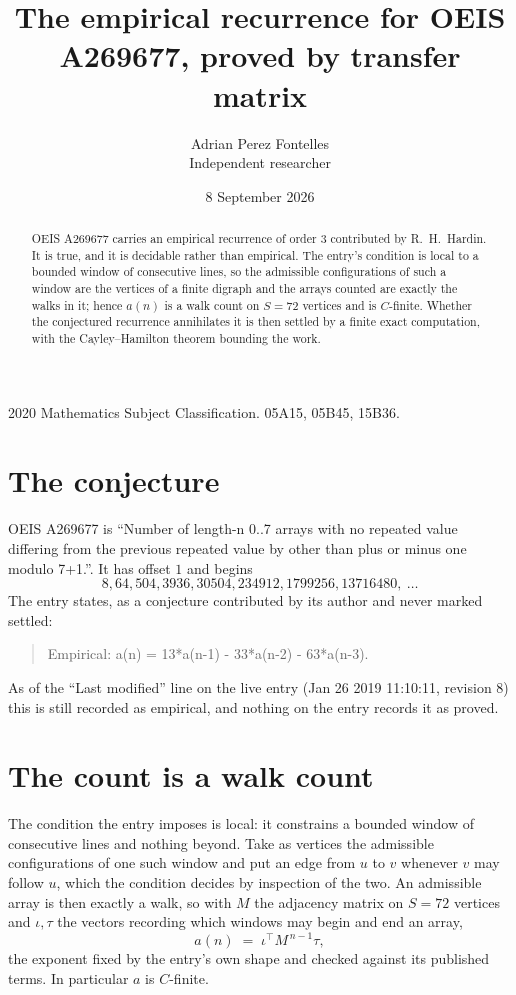 \documentclass[11pt,a4paper]{article}
\title{The empirical recurrence for OEIS A269677, proved by transfer matrix}
\author{Adrian Perez Fontelles\\ \small Independent researcher}
\date{8 September 2026}
\theoremstyle{plain}
\theoremstyle{definition}
\begin{document}
\maketitle

\begin{abstract}
OEIS A269677 carries an empirical recurrence of order $3$ contributed by R.~H.~Hardin. It is
true, and it is decidable rather than empirical. The entry's condition is local to a bounded window of consecutive lines, so
the admissible configurations of such a window are the vertices of a finite digraph and the
arrays counted are exactly the walks in it; hence $a(n)$ is a walk count on $S=72$ vertices
and is $C$-finite. Whether the conjectured recurrence annihilates it is then settled by a
finite exact computation, with the Cayley--Hamilton theorem bounding the work.
\end{abstract}

\noindent\small 2020 Mathematics Subject Classification. 05A15, 05B45, 15B36.\normalsize

\section{The conjecture}

OEIS A269677 is ``Number of length-n 0..7 arrays with no repeated value differing from the previous repeated value by other than plus or minus one modulo 7+1.''. It has offset $1$ and begins
\[
8, 64, 504, 3936, 30504, 234912, 1799256, 13716480,\ \dots
\]
The entry states, as a conjecture contributed by its author and never marked settled:
\begin{quote}
Empirical: a(n) = 13*a(n-1) - 33*a(n-2) - 63*a(n-3).
\end{quote}
As of the ``Last modified'' line on the live entry (Jan 26 2019 11:10:11, revision 8) this is still
recorded as empirical, and nothing on the entry records it as proved.

\section{The count is a walk count}

The condition the entry imposes is local: it constrains a bounded window of consecutive lines and nothing beyond. Take as
vertices the admissible configurations of one such window and put an edge from $u$ to $v$
whenever $v$ may follow $u$, which the condition decides by inspection of the two. An
admissible array is then exactly a walk, so with $M$ the adjacency matrix on $S=72$ vertices
and $\iota,\tau$ the vectors recording which windows may begin and end an array,
\[
a(n)\;=\;\iota^{\!\top}M^{\,n-1}\tau ,
\]
the exponent fixed by the entry's own shape and checked against its published terms. In
particular $a$ is $C$-finite.
\end{document}
